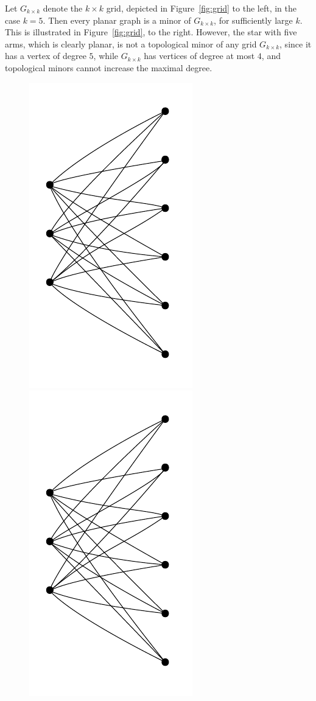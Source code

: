 \begin{example}
	Let $G_{k\times k}$ denote the $k\times k$ grid, depicted  in 
	Figure~\ref{fig:grid} to the left, in the case $k=5$. Then every planar 
	graph 
	is a minor of $G_{k\times k}$, for sufficiently large $k$.
	This is illustrated in Figure~\ref{fig:grid}, to the right.
	However, the star with five arms, which is clearly planar, is not a topological minor of any grid $G_{k\times k}$, since it has a vertex of degree $5$, while $G_{k\times k}$ has  vertices of degree at most $4$,
	and topological minors cannot increase the maximal degree.
	
	
	\begin{figure}[h]
	  \centering
	    \includegraphics[scale=0.35,page=5]{pictures.pdf}\hspace{3cm}
	    \includegraphics[scale=0.35,page=9]{pictures.pdf}		

\end{figure}
\end{example}
